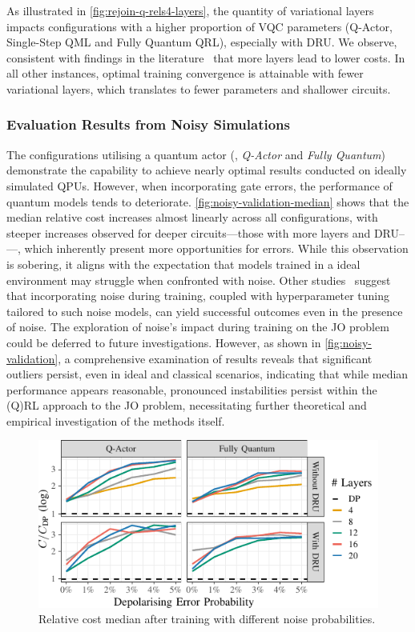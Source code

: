 \documentclass[10pt, conference]{IEEEtran}
\begin{document}
As illustrated in \autoref{fig:rejoin-q-rels4-layers}, the quantity of variational layers impacts configurations with a higher proportion of VQC parameters (Q-Actor, Single-Step QML and Fully Quantum QRL), especially with DRU.
We observe, consistent with findings in the literature~\cite{winker23, skolik22, jerbi21, dilip22} that more layers lead to lower costs.
In all other instances, optimal training convergence is attainable  with fewer variational layers, which translates to fewer parameters and shallower circuits.

\subsubsection{Evaluation Results from Noisy Simulations}
\label{sec:noisy-validation}

The configurations utilising a quantum actor (\ie, \emph{Q-Actor} and \emph{Fully Quantum}) demonstrate the capability to achieve nearly optimal results conducted on ideally simulated QPUs.
However, when incorporating gate errors, the performance of quantum models tends to deteriorate.
\autoref{fig:noisy-validation-median} shows that the median relative cost increases almost linearly across all configurations, with steeper increases observed for deeper circuits---those with more layers and 
DRU--—, which inherently present more opportunities for errors.
While this observation is sobering, it aligns with the expectation that models trained in a ideal environment may struggle when confronted with noise.
Other studies~\cite{skolik22, borras23} suggest that incorporating noise during training, coupled with hyperparameter tuning tailored to such noise models, can yield successful outcomes even in the presence of noise.
The exploration of noise's impact during training on the JO problem could be deferred to future investigations.
However, as shown in \autoref{fig:noisy-validation}, a comprehensive examination of results reveals that significant outliers persist, even in ideal and classical scenarios, indicating that while median performance appears reasonable, pronounced instabilities persist within the (Q)RL approach to the JO problem, necessitating further theoretical and empirical investigation of the methods itself.

\begin{figure}[htbp]
  \includegraphics{img-gen/noisy_validation_median.pdf}\vspace*{-0.5em}
  \caption{Relative cost median after training with different noise probabilities.}
  \label{fig:noisy-validation-median}
\end{figure}
\end{document}
